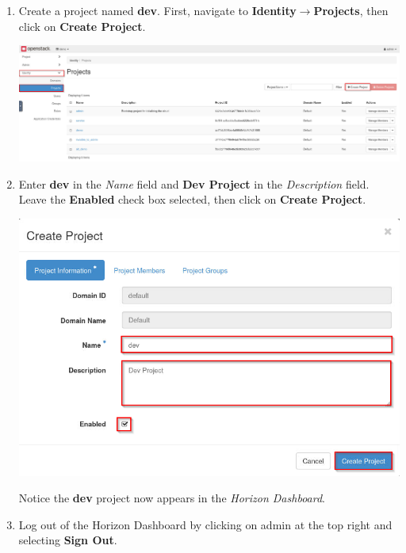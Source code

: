 \documentclass[letterpaper, 12pt]{article}
\begin{document}
\begin{enumerate}
    \item Create a project named \textbf{dev}. First, navigate to \textbf{Identity$\rightarrow$Projects}, then click on
    \textbf{Create Project}.

    \begin{center}
        \includegraphics[width=\linewidth]{images/part1/step3.png}
    \end{center}

    \item Enter \textbf{dev} in the \textit{Name} field and \textbf{Dev Project} in the \textit{Description} field.
    Leave the \textbf{Enabled} check box selected, then click on \textbf{Create Project}.

    \begin{center}
        \includegraphics[width=\linewidth]{images/part1/step4.png}
    \end{center}

    \begin{notebox}{}
        Notice the \textbf{dev} project now appears in the \textit{Horizon Dashboard}.
    \end{notebox}

    \item Log out of the Horizon Dashboard by clicking on admin at the top right and selecting \textbf{Sign Out}.
    

\end{enumerate}
\end{document}
